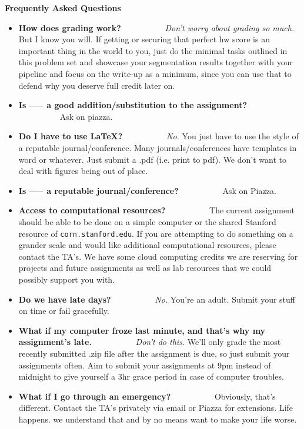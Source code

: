 \documentclass[10pt]{article}
\begin{document}
\clearpage
\noindent \Large \textbf{Frequently Asked Questions} \normalsize \\
\noindent\makebox[\linewidth]{\rule{\textwidth}{0.4pt}}
\begin{itemize}[noitemsep]
\item \textbf{How does grading work?} \ \ \ \ \ \ \ \ \ \ \textit{Don't worry about grading so much.}  But I know you will.  If getting or securing that perfect hw score is an important thing in the world to you, just do the minimal tasks outlined in this problem set and showcase your segmentation results together with your pipeline and focus on the write-up as a minimum, since you can use that to defend why you deserve full credit later on.
\item \textbf{Is ----- a good addition/substitution to the assignment?} \ \ \ \ \ \ \ \ \ \ Ask on piazza.
\item \textbf{Do I have to use \LaTeX?} \ \ \ \ \ \ \ \ \ \ \textit{No.}  You just have to use the style of a reputable journal/conference.  Many journals/conferences have templates in word or whatever.  Just submit a .pdf (i.e. print to pdf).  We don't want to deal with figures being out of place.
\item \textbf{Is ----- a reputable journal/conference?} \ \ \ \ \ \ \ \ \ \ Ask on Piazza.
\item \textbf{Access to computational resources?} \ \ \ \ \ \ \ \ \ \ The current assignment should be able to be done on a simple computer or the shared Stanford resource of \texttt{corn.stanford.edu}.  If you are attempting to do something on a grander scale and would like additional computational resources, please contact the TA's.  We have some cloud computing credits we are reserving for projects and future assignments as well as lab resources that we could possibly support you with.
\item \textbf{Do we have late days?} \ \ \ \ \ \ \ \ \ \ \textit{No.}  You're an adult.  Submit your stuff on time or fail gracefully.
\item \textbf{What if my computer froze last minute, and that's why my assignment's late.} \ \ \ \ \ \ \ \ \ \ \textit{Don't do this.}  We'll only grade the most recently submitted .zip file after the assignment is due, so just submit your assignments often.  Aim to submit your assignments at 9pm instead of midnight to give yourself a 3hr grace period in case of computer troubles.
\item \textbf{What if I go through an emergency?} \ \ \ \ \ \ \ \ \ \ Obviously, that's different.  Contact the TA's privately via email or Piazza for extensions.  Life happens.  we understand that and by no means want to make your life worse.

\end{itemize}
\end{document}
